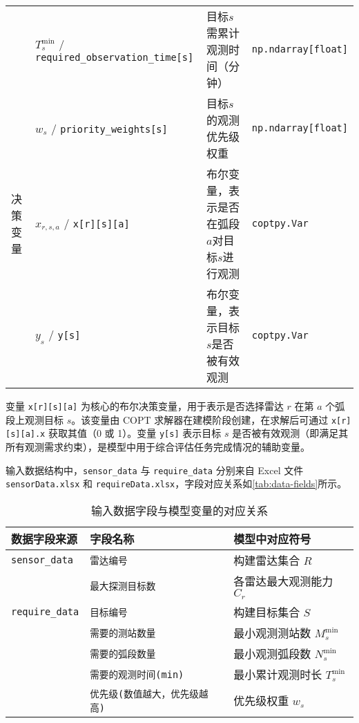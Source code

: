 \documentclass[openany,12pt,UTF8]{ctexart}
\begin{document}
\begin{sidewaystable}[h]
\begin{tabularx}{\columnwidth}{llXl}
             & $T_s^{\min}$ / \texttt{required\_observation\_time[s]} & 目标$s$需累计观测时间（分钟）                               & \texttt{np.ndarray[float]} \\
             & $w_s$ / \texttt{priority\_weights[s]}                  & 目标$s$的观测优先级权重                                  & \texttt{np.ndarray[float]} \\
        决策变量 & $x_{r,s,a}$ / \texttt{x[r][s][a]}                      & 布尔变量，表示是否在弧段$a$对目标$s$进行观测                      & \texttt{coptpy.Var}        \\
             & $y_s$ / \texttt{y[s]}                                  & 布尔变量，表示目标$s$是否被有效观测                            & \texttt{coptpy.Var}        \\
        \bottomrule
    \end{tabularx}
\end{sidewaystable}

变量 \texttt{x[r][s][a]} 为核心的布尔决策变量，用于表示是否选择雷达 $r$ 在第 $a$ 个弧段上观测目标 $s$。该变量由 COPT 求解器在建模阶段创建，在求解后可通过 \texttt{x[r][s][a].x} 获取其值（0 或 1）。变量 \texttt{y[s]} 表示目标 $s$ 是否被有效观测（即满足其所有观测需求约束），是模型中用于综合评估任务完成情况的辅助变量。

输入数据结构中，\texttt{sensor\_data} 与 \texttt{require\_data} 分别来自 Excel 文件 \texttt{sensorData.xlsx} 和 \texttt{requireData.xlsx}，字段对应关系如\autoref{tab:data-fields}所示。
\begin{table}[H]
    \centering
    \caption{输入数据字段与模型变量的对应关系}
    \label{tab:data-fields}
    \begin{tabular}{lll}
        \toprule
        \textbf{数据字段来源}        & \textbf{字段名称}            & \textbf{模型中对应符号}      \\
        \midrule
        \texttt{sensor\_data}  & \texttt{雷达编号}            & 构建雷达集合 $R$            \\
                               & \texttt{最大探测目标数}         & 各雷达最大观测能力 $C_r$       \\
        \addlinespace
        \texttt{require\_data} & \texttt{目标编号}            & 构建目标集合 $S$            \\
                               & \texttt{需要的测站数量}         & 最小观测测站数 $M_s^{\min}$  \\
                               & \texttt{需要的弧段数量}         & 最小观测弧段数 $N_s^{\min}$  \\
                               & \texttt{需要的观测时间(min)}    & 最小累计观测时长 $T_s^{\min}$ \\
                               & \texttt{优先级(数值越大，优先级越高)} & 优先级权重 $w_s$           \\
        \bottomrule
    \end{tabular}
\end{table}
\end{document}
